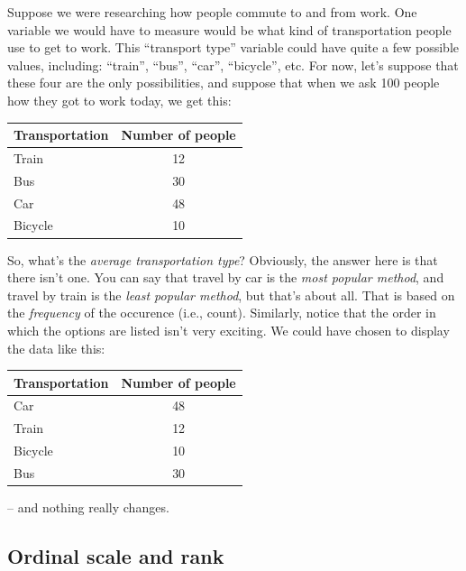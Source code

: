 \documentclass[
  11pt,
  a4paper,
  twoside,symmetric,openright]{book}
\theoremstyle{break}
\theoremstyle{break}
\begin{document}
\begin{example}
\protect\hypertarget{exm:exnominal}{}\label{exm:exnominal}Suppose we were researching how people commute to and from work. One variable we would have to measure would be what kind of transportation people use to get to work. This ``transport type'' variable could have quite a few possible values, including: ``train'', ``bus'', ``car'', ``bicycle'', etc. For now, let's suppose that these four are the only possibilities, and suppose that when we ask 100 people how they got to work today, we get this:

\begin{table}[H]
\centering
\begin{tabular}{lc}
\toprule
Transportation & Number of people\\
\midrule
Train & 12\\
Bus & 30\\
Car & 48\\
Bicycle & 10\\
\bottomrule
\end{tabular}
\end{table}

So, what's the \emph{average transportation type}? Obviously, the answer here is that there isn't one. You can say that travel by car is the \emph{most popular method}, and travel by train is the \emph{least popular method}, but that's about all. That is based on the \emph{frequency} of the occurence (i.e., count). Similarly, notice that the order in which the options are listed isn't very exciting. We could have chosen to display the data like this:

\begin{table}[H]
\centering
\begin{tabular}{lc}
\toprule
Transportation & Number of people\\
\midrule
Car & 48\\
Train & 12\\
Bicycle & 10\\
Bus & 30\\
\bottomrule
\end{tabular}
\end{table}

-- and nothing really changes.
\end{example}

\hypertarget{ordinalscale}{%
\subsection{Ordinal scale and rank}\label{ordinalscale}}
\end{document}
